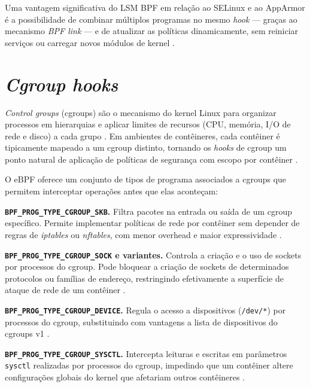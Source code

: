 Uma vantagem significativa do LSM BPF em relação ao SELinux e ao AppArmor é a
possibilidade de combinar múltiplos programas no mesmo \textit{hook} — graças ao
mecanismo \textit{BPF link} — e de atualizar as políticas dinamicamente, sem
reiniciar serviços ou carregar novos módulos de kernel \cite{linuxkernel2024}.

\section{\textit{Cgroup hooks}}

\textit{Control groups} (cgroups) são o mecanismo do kernel Linux para organizar
processos em hierarquias e aplicar limites de recursos (CPU, memória, I/O de
rede e disco) a cada grupo \cite{linuxkernel2024}.
Em ambientes de contêineres, cada contêiner é tipicamente mapeado a um cgroup
distinto, tornando os \textit{hooks} de cgroup um ponto natural de aplicação de
políticas de segurança com escopo por contêiner \cite{gregg2020}.

O eBPF oferece um conjunto de tipos de programa associados a cgroups que permitem
interceptar operações antes que elas aconteçam:

\textbf{\texttt{BPF\_PROG\_TYPE\_CGROUP\_SKB}.}
Filtra pacotes na entrada ou saída de um cgroup específico.
Permite implementar políticas de rede por contêiner sem depender de regras de
\textit{iptables} ou \textit{nftables}, com menor overhead e maior expressividade
\cite{linuxkernel2024}.

\textbf{\texttt{BPF\_PROG\_TYPE\_CGROUP\_SOCK} e variantes.}
Controla a criação e o uso de sockets por processos do cgroup.
Pode bloquear a criação de sockets de determinados protocolos ou famílias de
endereço, restringindo efetivamente a superfície de ataque de rede de um
contêiner \cite{gregg2019}.

\textbf{\texttt{BPF\_PROG\_TYPE\_CGROUP\_DEVICE}.}
Regula o acesso a dispositivos (\texttt{/dev/*}) por processos do cgroup,
substituindo com vantagens a lista de dispositivos do cgroups v1
\cite{linuxkernel2024}.

\textbf{\texttt{BPF\_PROG\_TYPE\_CGROUP\_SYSCTL}.}
Intercepta leituras e escritas em parâmetros \texttt{sysctl} realizadas por
processos do cgroup, impedindo que um contêiner altere configurações globais do
kernel que afetariam outros contêineres \cite{linuxkernel2024}.

